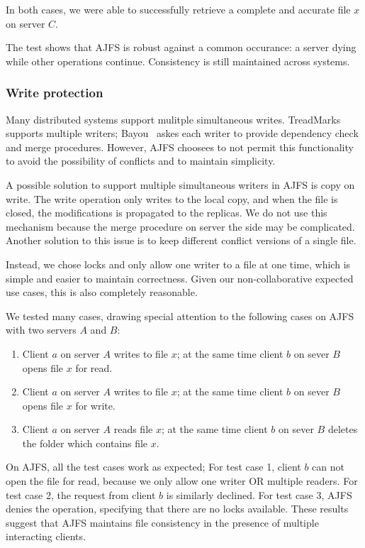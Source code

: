 In both cases, we were able to successfully retrieve a complete and accurate
file $x$ on server $C$.

The test shows that AJFS is robust against a common occurance: a server dying
while other operations continue. Consistency is still maintained across systems.

\subsubsection{Write protection}

Many distributed systems support mulitple simultaneous writes.
TreadMarks~\cite{treadmarks} supports multiple writers; Bayou~\cite{bayou} askes
each writer to provide dependency check and merge procedures.
However, AJFS choosees to not permit this functionality to avoid the possibility
of conflicts and to maintain simplicity.

A possible solution to support multiple simultaneous writers in AJFS is copy on
write. The write operation only writes to the local copy, and when the file is
closed, the modifications is propagated to the replicas. We do not use this
mechanism because the merge procedure on server the side may be complicated.
Another solution to this issue is to keep different conflict versions of a
single file. 

Instead, we chose locks and only allow one writer to a file at one time, which
is simple and easier to maintain correctness. Given our non-collaborative
expected use cases, this is also completely reasonable.

We tested many cases, drawing special attention to the following cases on AJFS
with two servers $A$ and $B$:
\begin{enumerate}
\item Client $a$ on server $A$ writes to file $x$; at the same time client $b$ on
sever $B$ opens file $x$ for read.
\item Client $a$ on server $A$ writes to file $x$; at the same time client $b$ on
sever $B$ opens file $x$ for write.
\item Client $a$ on server $A$ reads file $x$; at the same time client $b$ on
    sever $B$ deletes the folder which contains file $x$.
\end{enumerate}

On AJFS, all the test cases work as expected; For test case 1, client $b$ can
not open the file for read, because we only allow one writer OR multiple
readers. For test case 2, the request from client $b$ is similarly declined. For
test case 3, AJFS denies the operation, specifying that there are no locks
available. These results suggest that AJFS maintains file consistency in the
presence of multiple interacting clients.

